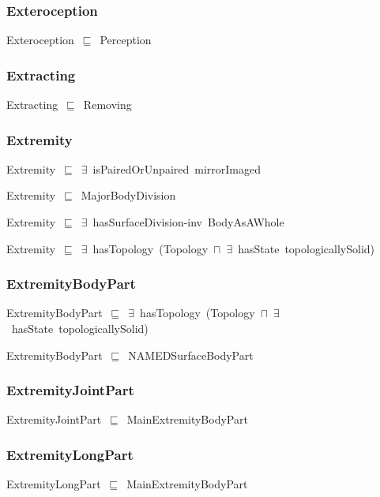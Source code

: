 \documentclass{article}
\begin{document}
\subsubsection*{Exteroception}

Exteroception~\ensuremath{\sqsubseteq}~Perception~

\subsubsection*{Extracting}

Extracting~\ensuremath{\sqsubseteq}~Removing~

\subsubsection*{Extremity}

Extremity~\ensuremath{\sqsubseteq}~\ensuremath{\exists}~isPairedOrUnpaired~mirrorImaged~

Extremity~\ensuremath{\sqsubseteq}~MajorBodyDivision~

Extremity~\ensuremath{\sqsubseteq}~\ensuremath{\exists}~hasSurfaceDivision-inv~BodyAsAWhole~

Extremity~\ensuremath{\sqsubseteq}~\ensuremath{\exists}~hasTopology~(Topology~\ensuremath{\sqcap}~\ensuremath{\exists}~hasState~topologicallySolid)~

\subsubsection*{ExtremityBodyPart}

ExtremityBodyPart~\ensuremath{\sqsubseteq}~\ensuremath{\exists}~hasTopology~(Topology~\ensuremath{\sqcap}~\ensuremath{\exists}~hasState~topologicallySolid)~

ExtremityBodyPart~\ensuremath{\sqsubseteq}~NAMEDSurfaceBodyPart~

\subsubsection*{ExtremityJointPart}

ExtremityJointPart~\ensuremath{\sqsubseteq}~MainExtremityBodyPart~

\subsubsection*{ExtremityLongPart}

ExtremityLongPart~\ensuremath{\sqsubseteq}~MainExtremityBodyPart~
\end{document}
